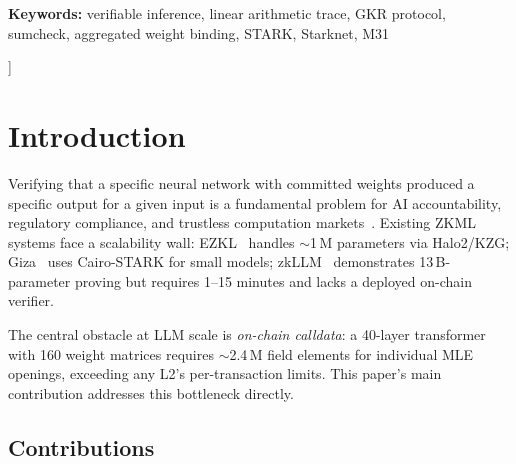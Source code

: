 \documentclass[10pt,twocolumn]{article}
\theoremstyle{definition}
\theoremstyle{remark}
\begin{document}
\begin{@twocolumnfalse}
\begin{center}
  \vspace{8pt}
  {\scriptsize\textbf{Keywords:}
    verifiable inference, linear arithmetic trace, GKR protocol,
    sumcheck, aggregated weight binding, STARK, Starknet, M31}

  \vspace{10pt}
\end{center}
\end{@twocolumnfalse}
]
\makeatother

\section{Introduction}\label{sec:intro}

Verifying that a specific neural network with committed weights produced a
specific output for a given input is a fundamental problem for AI
accountability, regulatory compliance, and trustless computation
markets~\cite{kang2022scaling, sun2024zkllm}.
Existing ZKML systems face a scalability wall:
EZKL~\cite{ezkl2024} handles $\sim$1\,M parameters via Halo2/KZG;
Giza~\cite{giza2024} uses Cairo-STARK for small models;
zkLLM~\cite{sun2024zkllm} demonstrates 13\,B-parameter proving but
requires 1--15 minutes and lacks a deployed on-chain verifier.

The central obstacle at LLM scale is \emph{on-chain calldata}:
a 40-layer transformer with 160 weight matrices requires
$\sim$2.4\,M field elements for individual MLE openings,
exceeding any L2's per-transaction limits.
This paper's main contribution addresses this bottleneck directly.

\subsection{Contributions}
\end{document}
